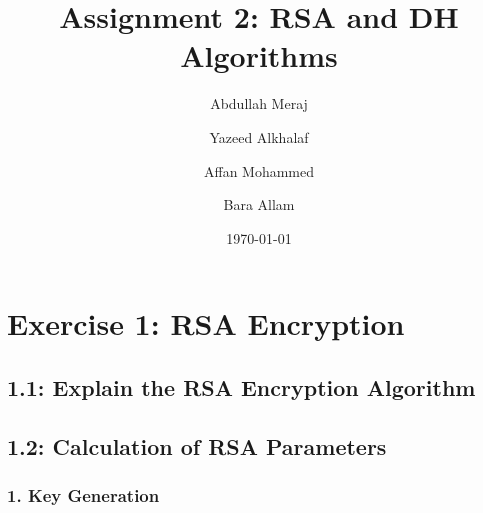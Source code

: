 \documentclass[a4paper]{article}
\title{Assignment 2: RSA and DH Algorithms}
\author{\author{Abdullah Meraj \and Yazeed Alkhalaf \and Affan Mohammed \and Bara Allam}}
\date{\today}
\begin{document}
\maketitle
\section*{Exercise 1: RSA Encryption}
\subsection*{1.1: Explain the RSA Encryption Algorithm}
\subsection*{1.2: Calculation of RSA Parameters}
\subsubsection*{1. Key Generation}
\end{document}
